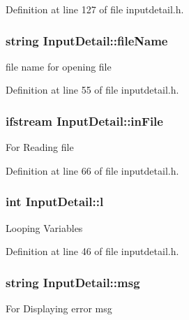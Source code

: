 \-Definition at line 127 of file inputdetail.\-h.

\hypertarget{classInputDetail_a4a7fb27e52bed0f40de143634f2c486b}{
\subsubsection[{file\-Name}]{\setlength{\rightskip}{0pt plus 5cm}string {\bf \-Input\-Detail\-::file\-Name}}}\label{db/d6e/classInputDetail_a4a7fb27e52bed0f40de143634f2c486b}
file name for opening file 

\-Definition at line 55 of file inputdetail.\-h.

\hypertarget{classInputDetail_a4c62c1934fbfcdcc8e2afaee44a87c15}{
\subsubsection[{in\-File}]{\setlength{\rightskip}{0pt plus 5cm}ifstream {\bf \-Input\-Detail\-::in\-File}}}\label{db/d6e/classInputDetail_a4c62c1934fbfcdcc8e2afaee44a87c15}
\-For \-Reading file 

\-Definition at line 66 of file inputdetail.\-h.

\hypertarget{classInputDetail_a3a950727518c2f6ed3c068125a037b9e}{
\subsubsection[{l}]{\setlength{\rightskip}{0pt plus 5cm}int {\bf \-Input\-Detail\-::l}}}\label{db/d6e/classInputDetail_a3a950727518c2f6ed3c068125a037b9e}
\-Looping \-Variables 

\-Definition at line 46 of file inputdetail.\-h.

\hypertarget{classInputDetail_a1abb16cd695678c3fa05e3c812823fee}{
\subsubsection[{msg}]{\setlength{\rightskip}{0pt plus 5cm}string {\bf \-Input\-Detail\-::msg}}}\label{db/d6e/classInputDetail_a1abb16cd695678c3fa05e3c812823fee}
\-For \-Displaying error msg 

